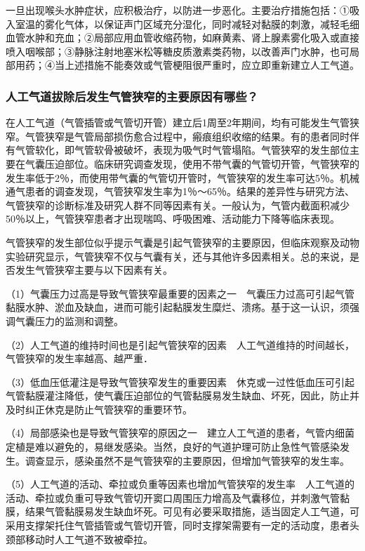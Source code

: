 一旦出现喉头水肿症状，应积极治疗，以防进一步恶化。主要治疗措施包括：①吸入室温的雾化气体，以保证声门区域充分湿化，同时减轻对黏膜的刺激，减轻毛细血管水肿和充血；②局部应用血管收缩药物，如麻黄素、肾上腺素雾化吸入或直接喷入咽喉部；③静脉注射地塞米松等糖皮质激素类药物，以改善声门水肿，也可局部用药；④当上述措施不能奏效或气管梗阻很严重时，应立即重新建立人工气道。

\subsubsection{人工气道拔除后发生气管狭窄的主要原因有哪些？}

在人工气道（气管插管或气管切开管）建立后1周至2年期间，均有可能发生气管狭窄。气管狭窄是气管局部损伤愈合过程中，瘢痕组织收缩的结果。有的患者同时伴有气管软化，即气管软骨被破坏，表现为吸气时气管塌陷。气管狭窄的发生部位主要在气囊压迫部位。临床研究调查发现，使用不带气囊的气管切开管，气管狭窄的发生率低于2％，而使用带气囊的气管切开管时，气管狭窄的发生率可达5％。机械通气患者的调查发现，气管狭窄发生率为1％～65％。结果的差异性与研究方法、气管狭窄的诊断标准及研究人群不同等因素有关。一般认为，气管内截面积减少50％以上，气管狭窄患者才出现喘鸣、呼吸困难、活动能力下降等临床表现。

气管狭窄的发生部位似乎提示气囊是引起气管狭窄的主要原因，但临床观察及动物实验研究显示，气管狭窄不仅与气囊有关，还与其他许多因素相关。总的来说，是否发生气管狭窄主要与以下因素有关。

（1）气囊压力过高是导致气管狭窄最重要的因素之一　气囊压力过高可引起气管黏膜水肿、淤血及缺血，进而可能引起黏膜发生糜烂、溃疡。基于这一认识，须强调气囊压力的监测和调整。

（2）人工气道的维持时间也是引起气管狭窄的因素　人工气道维持的时间越长，气管狭窄的发生率越高、越严重．

（3）低血压低灌注是导致气管狭窄发生的重要因素　休克或一过性低血压可引起气管黏膜灌注降低，使气囊压迫部位的气管黏膜易发生缺血、坏死，因此，防止并及时纠正休克是防止气管狭窄的重要环节。

（4）局部感染也是导致气管狭窄的原因之一　建立人工气道的患者，气管内细菌定植是难以避免的，易继发感染。当然，良好的气道护理可防止急性气管感染发生。调查显示，感染虽然不是气管狭窄的主要原因，但增加气管狭窄的发生率。

（5）人工气道的活动、牵拉或负重等因素也增加气管狭窄的发生率　人工气道的活动、牵拉或负重可导致气管切开窦口周围压力增高及气囊移位，并刺激气管黏膜，结果气管黏膜易发生缺血坏死。可见有必要采取措施，适当固定人工气道，可采用支撑架托住气管插管或气管切开管，同时支撑架需要有一定的活动度，患者头颈部移动时人工气道不致被牵拉。

